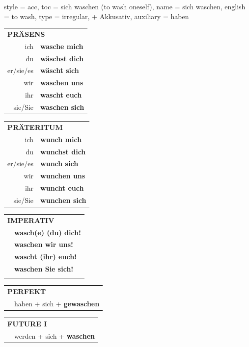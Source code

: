 \begin{verbentry}{
  style = {acc},
  toc = {sich waschen (to wash oneself)},
  name = {sich waschen},
  english = {to wash},
  type = {irregular, + Akkusativ},
  auxiliary = {haben}
}
  \begin{tabular}{rl}
     \multicolumn{2}{l}{\textbf{PRÄSENS} }\\
    ich & \textbf{wasche mich}\\
    du & \textbf{wäschst dich}\\
    er/sie/es & \textbf{wäscht sich}\\
    wir & \textbf{waschen uns}\\
    ihr & \textbf{wascht euch}\\
    sie/Sie & \textbf{waschen sich}\\
  \end{tabular}
  \hfill
     \begin{tabular}{rl}
    \multicolumn{2}{l}{\textbf{PRÄTERITUM} }\\
    ich & \textbf{wunch mich}\\
    du & \textbf{wunchst dich}\\
    er/sie/es & \textbf{wunch sich}\\
    wir & \textbf{wunchen uns}\\
    ihr & \textbf{wuncht euch}\\
    sie/Sie & \textbf{wunchen sich}\\
  \end{tabular}
  \hfill
  \begin{tabular}{rl}
     \multicolumn{2}{l}{\textbf{IMPERATIV} }\\
   & \textbf{wasch(e) (du) dich!}\\
   & \textbf{waschen wir uns!}\\
   & \textbf{wascht (ihr) euch!}\\
   & \textbf{waschen Sie sich!}\\
   & \vspace{10pt}
  \end{tabular}

    \vspace{10pt}

 \begin{tabular}{rl}
     \multicolumn{2}{l}{\textbf{PERFEKT}}\\
    &haben + sich + \textbf{gewaschen}\\
  \end{tabular}
\hfill
   \begin{tabular}{rl}
   
    \multicolumn{2}{l}{\textbf{FUTURE I} }\\
    &werden + sich + \textbf{waschen}\\
 

\end{tabular}
\end{verbentry}
